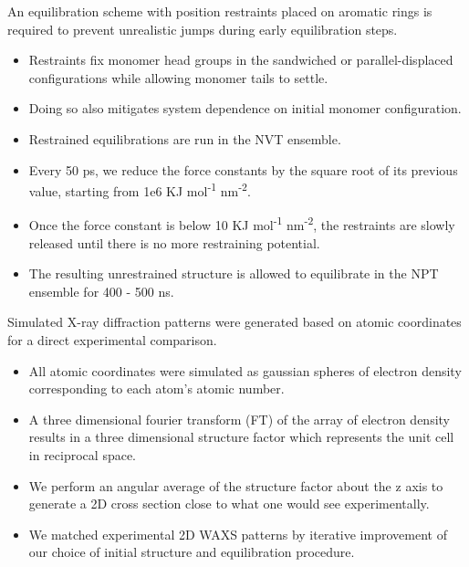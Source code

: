 \documentclass{article}
\begin{document}
  An equilibration scheme with position restraints placed on aromatic rings
  is required to prevent
  unrealistic jumps during early equilibration steps.
  \begin{itemize}
    \item Restraints fix monomer head groups in the sandwiched or parallel-displaced
    configurations while allowing monomer tails to settle.
    \item Doing so also mitigates system dependence on initial monomer configuration.
    \item Restrained equilibrations are run in the NVT ensemble.
    \item Every 50 ps, we reduce the force constants by the square root of its 
    previous value, starting from 1e6 KJ mol\textsuperscript{-1} nm\textsuperscript{-2}.
    \item Once the force constant is below 10 KJ mol\textsuperscript{-1} 
    nm\textsuperscript{-2}, the restraints are slowly released until there is no more 
    restraining potential.  %
    \item The resulting unrestrained structure is allowed to equilibrate in the NPT
    ensemble for 400 - 500 ns.
  \end{itemize}
  
  Simulated X-ray diffraction patterns were generated based on atomic
  coordinates for a direct experimental comparison.
  \begin{itemize}
    \item All atomic coordinates were simulated as gaussian spheres of electron
    density corresponding to each atom's atomic number.
    \item A three dimensional fourier transform (FT) of the array of electron 
    density results in a three dimensional structure factor which represents
    the unit cell in reciprocal space.
    \item We perform an angular average of the structure factor about the 
    z axis to generate a 2D cross section close to what one would see 
    experimentally.
    \item We matched experimental 2D WAXS patterns by iterative improvement
    of our choice of initial structure and equilibration procedure.
  \end{itemize}
  
\end{document}
